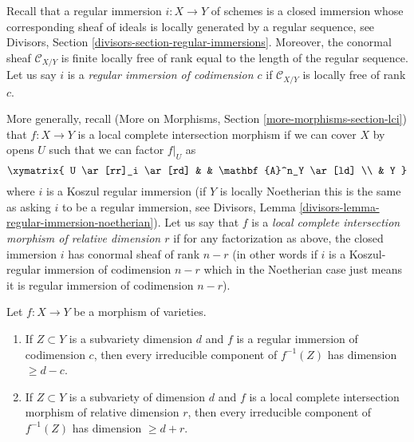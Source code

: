 \noindent
Recall that a regular immersion $i : X \to Y$ of schemes
is a closed immersion whose
corresponding sheaf of ideals is locally generated by a regular sequence, see
Divisors, Section \ref{divisors-section-regular-immersions}.
Moreover, the conormal sheaf $\mathcal{C}_{X/Y}$ is finite locally free of
rank equal to the length of the regular sequence. Let us say $i$ is a
{\it regular immersion of codimension $c$}
if $\mathcal{C}_{X/Y}$ is locally free of rank $c$.

\medskip\noindent
More generally, recall
(More on Morphisms, Section \ref{more-morphisms-section-lci})
that $f : X \to Y$ is a local complete intersection
morphism if we can cover $X$ by opens $U$ such that we can factor
$f|_U$ as
$$
\xymatrix{
U \ar[rr]_i \ar[rd] & & \mathbf{A}^n_Y \ar[ld] \\
& Y
}
$$
where $i$ is a Koszul regular immersion (if $Y$ is locally Noetherian
this is the same as asking $i$ to be a regular immersion, see
Divisors, Lemma \ref{divisors-lemma-regular-immersion-noetherian}).
Let us say that $f$ is a {\it local complete intersection morphism
of relative dimension $r$} if for any factorization as above, the
closed immersion $i$ has conormal sheaf of rank $n - r$ (in other
words if $i$ is a Koszul-regular immersion of codimension $n - r$
which in the Noetherian case just means it is regular immersion of
codimension $n - r$).

\begin{lemma}
\label{lemma-pullback-by-regular-immersion}
Let $f : X \to Y$ be a morphism of varieties.
\begin{enumerate}
\item If $Z \subset Y$ is a subvariety dimension $d$ and $f$ is a regular
immersion of codimension $c$, then every irreducible component
of $f^{-1}(Z)$ has dimension $\geq d - c$.
\item If $Z \subset Y$ is a subvariety of dimension $d$ and
$f$ is a local complete intersection morphism of relative dimension $r$,
then every irreducible component of $f^{-1}(Z)$ has dimension $\geq d + r$.
\end{enumerate}
\end{lemma}

